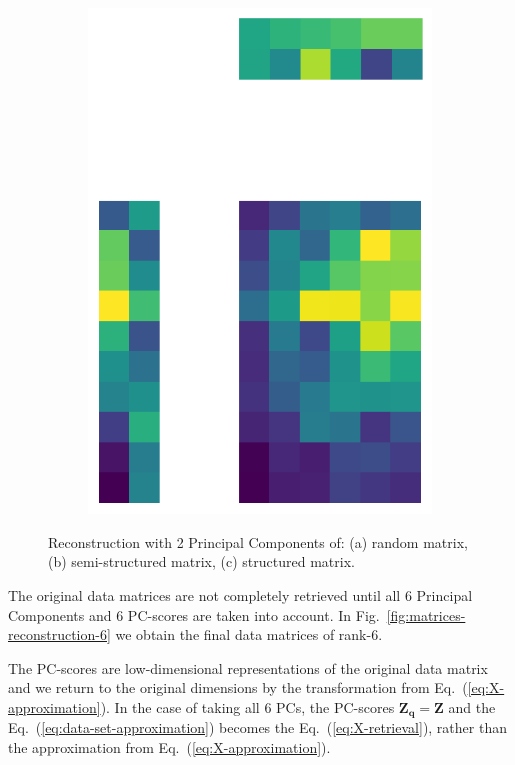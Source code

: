 \documentclass[10pt,twocolumn]{article}
\begin{document}
\begin{figure}[H]
\begin{subfigure}[t]{.15\textwidth}
\includegraphics[scale=.2]{structured-matrix-reconstruction-PCs-2.png}
\caption{ }
\end{subfigure}
\caption{Reconstruction with 2 Principal Components of: (a) random matrix, (b) semi-structured matrix, (c) structured matrix.}
\label{fig:matrices-reconstruction-2}
\end{figure}

The original data matrices are not completely retrieved until all 6 Principal Components and 6 PC-scores are taken into account. In Fig.~\ref{fig:matrices-reconstruction-6} we obtain the final data matrices of rank-6.

The PC-scores are low-dimensional representations of the original data matrix and we return to the original dimensions by the transformation from Eq.~(\ref{eq:X-approximation}). In the case of taking all 6 PCs, the PC-scores $\mathbf{Z_q} = \mathbf{Z}$ and the Eq.~(\ref{eq:data-set-approximation}) becomes the Eq.~(\ref{eq:X-retrieval}), rather than the approximation from Eq.~(\ref{eq:X-approximation}).
\end{document}
